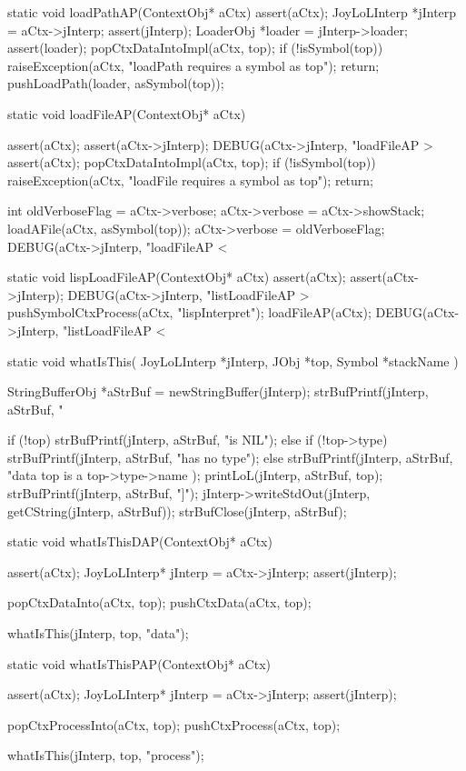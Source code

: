 \startCCode
static void loadPathAP(ContextObj* aCtx) {
  assert(aCtx);
  JoyLoLInterp *jInterp = aCtx->jInterp;
  assert(jInterp);
  LoaderObj *loader = jInterp->loader;
  assert(loader);
  popCtxDataIntoImpl(aCtx, top);
  if (!isSymbol(top)) {
    raiseException(aCtx,
      "loadPath requires a symbol as top");
    return;
  }
  pushLoadPath(loader, asSymbol(top));
}
\stopCCode

\startCCode
static void loadFileAP(ContextObj* aCtx) {
  assert(aCtx);
  assert(aCtx->jInterp);
  DEBUG(aCtx->jInterp, "loadFileAP > %
  assert(aCtx);
  popCtxDataIntoImpl(aCtx, top);
  if (!isSymbol(top)) {
    raiseException(aCtx,
      "loadFile requires a symbol as top");
    return;
  }
  
  int oldVerboseFlag = aCtx->verbose;
  aCtx->verbose = aCtx->showStack;
  loadAFile(aCtx, asSymbol(top));
  aCtx->verbose = oldVerboseFlag;
  DEBUG(aCtx->jInterp, "loadFileAP < %
}
\stopCCode

\startCCode
static void lispLoadFileAP(ContextObj* aCtx) {
  assert(aCtx);
  assert(aCtx->jInterp);
  DEBUG(aCtx->jInterp, "listLoadFileAP > %
  pushSymbolCtxProcess(aCtx, "lispInterpret");
  loadFileAP(aCtx);
  DEBUG(aCtx->jInterp, "listLoadFileAP < %
}
\stopCCode

\startCCode
static void whatIsThis(
  JoyLoLInterp *jInterp,
  JObj         *top,
  Symbol       *stackName
) {
  StringBufferObj *aStrBuf =
    newStringBuffer(jInterp);
  strBufPrintf(jInterp, aStrBuf, "%

  if (!top) {
    strBufPrintf(jInterp, aStrBuf, "is NIL\n");
  } else {
    if (!top->type) {
      strBufPrintf(jInterp, aStrBuf, "has no type\n");
    } else {
      strBufPrintf(jInterp, aStrBuf,
        "data top is a %
        top->type->name
      );
      printLoL(jInterp, aStrBuf, top);
      strBufPrintf(jInterp, aStrBuf, "]\n");
    }
  }
  jInterp->writeStdOut(jInterp, getCString(jInterp, aStrBuf));
  strBufClose(jInterp, aStrBuf);      
}

static void whatIsThisDAP(ContextObj* aCtx) {
  assert(aCtx);
  JoyLoLInterp* jInterp = aCtx->jInterp;
  assert(jInterp);
  
  popCtxDataInto(aCtx, top);
  pushCtxData(aCtx, top);
  
  whatIsThis(jInterp, top, "data");
}

static void whatIsThisPAP(ContextObj* aCtx) {
  assert(aCtx);
  JoyLoLInterp* jInterp = aCtx->jInterp;
  assert(jInterp);
  
  popCtxProcessInto(aCtx, top);
  pushCtxProcess(aCtx, top);
  
  whatIsThis(jInterp, top, "process");
}
\stopCCode

